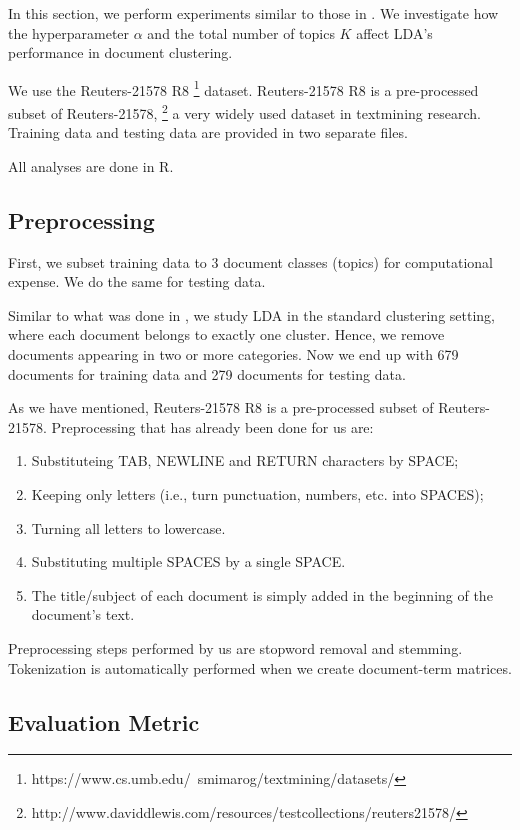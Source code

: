 \documentclass{article}
\begin{document}
In this section, we perform experiments similar to those in \cite{lu2011investigating}. We investigate how the hyperparameter $\alpha$ and the total number of topics $K$ affect LDA's performance in document clustering.

We use the Reuters-21578 R8 \footnote{https://www.cs.umb.edu/~smimarog/textmining/datasets/} dataset. Reuters-21578 R8 is a pre-processed subset of Reuters-21578, \footnote{http://www.daviddlewis.com/resources/testcollections/reuters21578/} a very widely used dataset in textmining research. Training data and testing data are provided in two separate files.

All analyses are done in R.

\subsection{Preprocessing}

First, we subset training data to 3 document classes (topics) for computational expense. We do the same for testing data.

Similar to what was done in \cite{lu2011investigating}, we study LDA in the standard clustering setting, where each document belongs to exactly one cluster. Hence, we remove documents appearing in two or more categories. Now we end up with 679 documents for training data and 279 documents for testing data.

As we have mentioned, Reuters-21578 R8 is a pre-processed subset of Reuters-21578. Preprocessing that has already been done for us are:

\begin{enumerate}
  \item Substituteing TAB, NEWLINE and RETURN characters by SPACE;
  \item Keeping only letters (i.e., turn punctuation, numbers, etc. into SPACES);
  \item Turning all letters to lowercase.
  \item Substituting multiple SPACES by a single SPACE.
  \item The title/subject of each document is simply added in the beginning of the document's text.
\end{enumerate}

Preprocessing steps performed by us are stopword removal and stemming. Tokenization is automatically performed when we create document-term matrices.


\subsection{Evaluation Metric}
\end{document}
